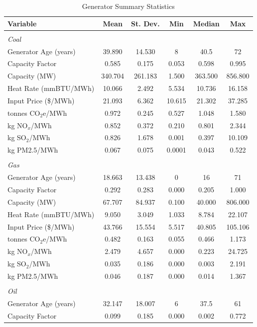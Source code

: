 \begin{table}
    \centering
    \caption{Generator Summary Statistics}
\begin{tabular}{l c c c c c}
    \hline\hline
    Variable & Mean & St. Dev. & Min & Median & Max \\
    \hline\\[-1.8ex]
    \textit{Coal} \\
    \hline
    Generator Age (years) & 39.890 & 14.530 & 8 & 40.5 & 72 \\ 
Capacity Factor & 0.585 & 0.175 & 0.053 & 0.598 & 0.995 \\ 
Capacity (MW) & 340.704 & 261.183 & 1.500 & 363.500 & 856.800 \\ 
Heat Rate (mmBTU/MWh) & 10.066 & 2.492 & 5.534 & 10.736 & 16.158 \\ 
Input Price (\$/MWh) & 21.093 & 6.362 & 10.615 & 21.302 & 37.285 \\ 
tonnes CO$_2$e/MWh & 0.972 & 0.245 & 0.527 & 1.048 & 1.580 \\ 
kg NO$_x$/MWh & 0.852 & 0.372 & 0.210 & 0.801 & 2.344 \\ 
kg SO$_2$/MWh & 0.826 & 1.678 & 0.001 & 0.397 & 10.109 \\ 
kg PM2.5/MWh & 0.067 & 0.075 & 0.0001 & 0.043 & 0.522 \\ \\[-1.8ex]
\textit{Gas} \\
\hline
Generator Age (years) & 18.663 & 13.438 & 0 & 16 & 71 \\ 
Capacity Factor & 0.292 & 0.283 & 0.000 & 0.205 & 1.000 \\ 
Capacity (MW) & 67.707 & 84.937 & 0.100 & 40.000 & 806.000 \\ 
Heat Rate (mmBTU/MWh) & 9.050 & 3.049 & 1.033 & 8.784 & 22.107 \\ 
Input Price (\$/MWh) & 43.766 & 15.554 & 5.517 & 40.805 & 105.106 \\ 
tonnes CO$_2$e/MWh & 0.482 & 0.163 & 0.055 & 0.466 & 1.173 \\ 
kg NO$_x$/MWh & 2.479 & 4.657 & 0.000 & 0.223 & 24.725 \\ 
kg SO$_2$/MWh & 0.035 & 0.186 & 0.000 & 0.003 & 2.191 \\ 
kg PM2.5/MWh & 0.046 & 0.187 & 0.000 & 0.014 & 1.367 \\ \\[-1.8ex]
\textit{Oil} \\
\hline
Generator Age (years) & 32.147 & 18.007 & 6 & 37.5 & 61 \\ 
Capacity Factor & 0.099 & 0.185 & 0.000 & 0.002 & 0.772 \\ 

\end{tabular}
\end{table}
